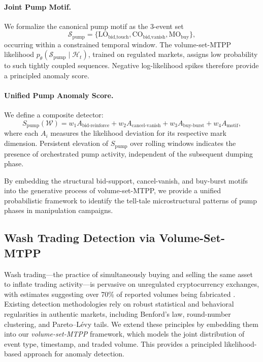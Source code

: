 \paragraph{Joint Pump Motif.}
We formalize the canonical pump motif as the 3-event set
\[
\mathcal{S}_{\text{pump}} = \{\text{LO}_{\text{bid,touch}}, \text{CO}_{\text{bid,vanish}}, \text{MO}_{\text{buy}}\},
\]
occurring within a constrained temporal window. The volume-set-MTPP likelihood $p_\theta(\mathcal{S}_{\text{pump}} \mid \mathcal{H}_t)$, trained on regulated markets, assigns low probability to such tightly coupled sequences. Negative log-likelihood spikes therefore provide a principled anomaly score.

\paragraph{Unified Pump Anomaly Score.}
We define a composite detector:
\[
S_{\text{pump}}(\mathcal{W}) = w_1 A_{\text{bid-reinforce}} + w_2 A_{\text{cancel-vanish}} + w_3 A_{\text{buy-burst}} + w_4 A_{\text{motif}},
\]
where each $A_i$ measures the likelihood deviation for its respective mark dimension. Persistent elevation of $S_{\text{pump}}$ over rolling windows indicates the presence of orchestrated pump activity, independent of the subsequent dumping phase.

\noindent By embedding the structural bid-support, cancel-vanish, and buy-burst motifs into the generative process of volume-set-MTPP, we provide a unified probabilistic framework to identify the tell-tale microstructural patterns of pump phases in manipulation campaigns.


\subsection{Wash Trading Detection via Volume-Set-MTPP}
\label{subsec:wash-mtpp}

Wash trading---the practice of simultaneously buying and selling the same asset to inflate trading activity---is pervasive on unregulated cryptocurrency exchanges, with estimates suggesting over 70\% of reported volumes being fabricated \cite{Cong2022}. Existing detection methodologies rely on robust statistical and behavioral regularities in authentic markets, including Benford’s law, round-number clustering, and Pareto–Lévy tails. We extend these principles by embedding them into our \emph{volume-set-MTPP} framework, which models the joint distribution of event type, timestamp, and traded volume. This provides a principled likelihood-based approach for anomaly detection.

